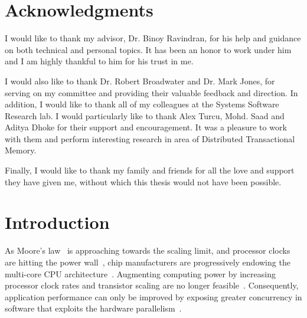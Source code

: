 \documentclass[12pt,english]{report}
\begin{document}
\chapter*{Acknowledgments}

I would like to thank my advisor, Dr. Binoy Ravindran, for his help and guidance on both technical and personal topics. It has been an honor to work under him and I am highly thankful to him for his trust in me.

I would also like to thank Dr. Robert Broadwater and Dr. Mark Jones, for serving on my committee and providing their valuable feedback and direction. In addition, I would like to thank all of my colleagues
at the Systems Software Research lab. I would particularly like to thank Alex Turcu, Mohd. Saad and Aditya Dhoke for their support and encouragement. It was a pleasure to work with them and perform interesting research in area of Distributed Transactional Memory.

Finally, I would like to thank my family and friends for all the love and support they have given me, without which this thesis would not have been possible.

\tableofcontents
\pagebreak

\listoffigures
\pagebreak


\listoftables
\pagebreak


\pagestyle{myheadings}


\chapter{Introduction}\label{chap:intro}

As Moore's law~\cite{schaller1997moore} is approaching towards the scaling limit, and processor clocks are hitting the power wall~\cite{Kish2002144}, chip manufacturers are progressively endowing the multi-core CPU architecture~\cite{Sun2010183}. Augmenting computing power by increasing processor clock rates and transistor scaling are no longer feasible~\cite{Thompson200620}. Consequently, application performance can only be improved by exposing greater concurrency in software that exploits the hardware parallelism~\cite{Mulitcore4563876}. 
\end{document}

